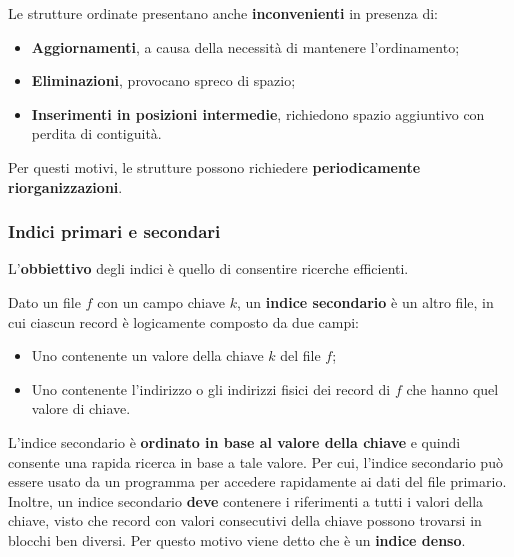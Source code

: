 \documentclass[a4paper]{article}
\begin{document}
	\noindent
	Le strutture ordinate presentano anche \textbf{inconvenienti} in presenza di:
	\begin{itemize}
		\item \textbf{Aggiornamenti}, a causa della necessità di mantenere l'ordinamento;
		\item \textbf{Eliminazioni}, provocano spreco di spazio;
		\item \textbf{Inserimenti in posizioni intermedie}, richiedono spazio aggiuntivo con perdita di contiguità.
	\end{itemize}
	Per questi motivi, le strutture possono richiedere \textbf{periodicamente riorganizzazioni}.\newpage

	\subsubsection{Indici primari e secondari}

	L'\textbf{obbiettivo} degli indici è quello di consentire ricerche efficienti.\newline

	\noindent
	Dato un file $f$ con un campo chiave $k$, un \textcolor{Red3}{\textbf{indice secondario}} è un altro file, in cui ciascun record è logicamente composto da due campi:
	\begin{itemize}
		\item Uno contenente un valore della chiave $k$ del file $f$;
		\item Uno contenente l'indirizzo o gli indirizzi fisici dei record di $f$ che hanno quel valore di chiave.
	\end{itemize}
	L'indice secondario è \textbf{ordinato in base al valore della chiave} e quindi consente una rapida ricerca in base a tale valore. Per cui, l'indice secondario può essere usato da un programma per accedere rapidamente ai dati del file primario.\newline
	Inoltre, un indice secondario \textbf{deve} contenere i riferimenti a tutti i valori della chiave, visto che record con valori consecutivi della chiave possono trovarsi in blocchi ben diversi. Per questo motivo viene detto che è un \textcolor{Red3}{\textbf{indice denso}}.\newline
\end{document}
